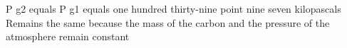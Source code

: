 P g2 equals P g1 equals one hundred thirty-nine point nine seven kilopascals  
Remains the same because the mass of the carbon and the pressure of the atmosphere remain constant
